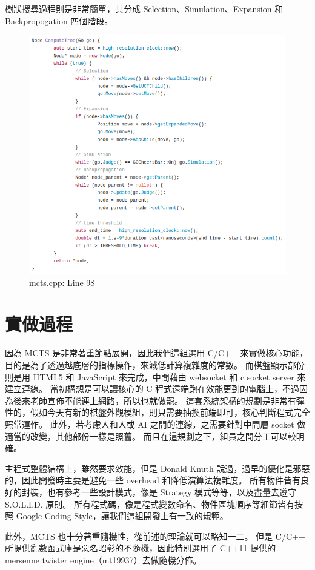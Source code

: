\documentclass[12pt]{article}
\begin{document}
\begin{CJK}{UTF8}{bsmi}
樹狀搜尋過程則是非常簡單，共分成 Selection、Simulation、Expansion 和 Backpropogation 四個階段。
\begin{figure}[h]
  \caption{mcts.cpp: Line 98}
  \centering
  \includegraphics[width=.8\textwidth]{tree}
\end{figure}

\section{實做過程}
因為 MCTS 是非常著重節點展開，因此我們這組選用 C/C++ 來實做核心功能，目的是為了透過越底層的指標操作，來減低計算複雜度的常數。
而棋盤顯示部份則是用 HTML5 和 JavaScript 來完成，中間藉由 websocket 和 c socket server 來建立連線。
當初構想是可以讓核心的 C 程式遠端跑在效能更到的電腦上，不過因為後來老師宣佈不能連上網路，所以也就做罷。
這套系統架構的規劃是非常有彈性的，假如今天有新的棋盤外觀模組，則只需要抽換前端即可，核心判斷程式完全照常運作。
此外，若考慮人和人或 AI 之間的連線，之需要針對中間層 socket 做適當的改變，其他部份一樣是照舊。
而且在這規劃之下，組員之間分工可以較明確。

主程式整體結構上，雖然要求效能，但是 Donald Knuth 說過，過早的優化是邪惡的，因此開發時主要是避免一些 overhead 和降低演算法複雜度。
所有物件皆有良好的封裝，也有參考一些設計模式，像是 Strategy 模式等等，以及盡量去遵守 S.O.L.I.D. 原則。
所有程式碼，像是程式變數命名、物件區塊順序等細節皆有按照 Google Coding Style，讓我們這組開發上有一致的規範。

此外，MCTS 也十分著重隨機性，從前述的理論就可以略知一二。
但是 C/C++ 所提供亂數函式庫是惡名昭彰的不隨機，因此特別選用了 C++11 提供的 mersenne twister engine（mt19937）去做隨機分佈。


\end{CJK}
\end{document}
